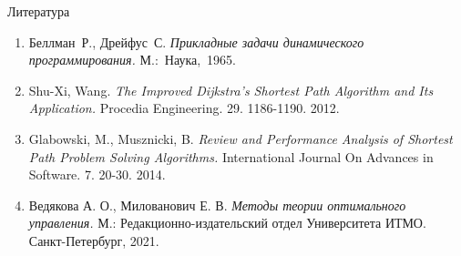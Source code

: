     \begin{frame}[t]{Литература}
        \begin{enumerate}
            \item Беллман~Р., Дрейфус~С. \textit{Прикладные задачи динамического программирования.} М.:~Наука,~1965.
            \item Shu-Xi, Wang. \textit{The Improved Dijkstra's Shortest Path Algorithm and Its Application.} Procedia Engineering. 29. 1186-1190. 2012.
            \item Glabowski, M., Musznicki, B. \textit{Review and Performance Analysis of Shortest Path Problem Solving Algorithms.} International Journal On Advances in Software. 7. 20-30. 2014.
            \item Ведякова А. О., Милованович Е. В. \textit{Методы теории оптимального управления.} М.: Редакционно-издательский отдел Университета ИТМО. Санкт-Петербург, 2021.
        \end{enumerate}
    \end{frame}
